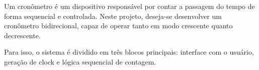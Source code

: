 Um cronômetro é um dispositivo responsável por contar a passagem do tempo de forma sequencial e controlada. Neste projeto, deseja-se desenvolver um cronômetro bidirecional, capaz de operar tanto em modo crescente quanto decrescente.

Para isso, o sistema é dividido em três blocos principais: interface com o usuário, geração de clock e lógica sequencial de contagem.

